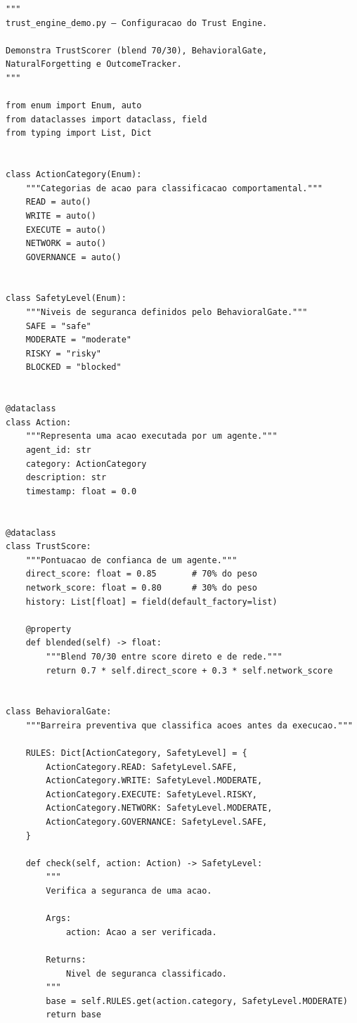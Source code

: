 \begin{lstlisting}[caption={Configuracao do Trust Engine},
                   label={cod:trust}, style=pythonstyle]
"""
trust_engine_demo.py — Configuracao do Trust Engine.

Demonstra TrustScorer (blend 70/30), BehavioralGate,
NaturalForgetting e OutcomeTracker.
"""

from enum import Enum, auto
from dataclasses import dataclass, field
from typing import List, Dict


class ActionCategory(Enum):
    """Categorias de acao para classificacao comportamental."""
    READ = auto()
    WRITE = auto()
    EXECUTE = auto()
    NETWORK = auto()
    GOVERNANCE = auto()


class SafetyLevel(Enum):
    """Niveis de seguranca definidos pelo BehavioralGate."""
    SAFE = "safe"
    MODERATE = "moderate"
    RISKY = "risky"
    BLOCKED = "blocked"


@dataclass
class Action:
    """Representa uma acao executada por um agente."""
    agent_id: str
    category: ActionCategory
    description: str
    timestamp: float = 0.0


@dataclass
class TrustScore:
    """Pontuacao de confianca de um agente."""
    direct_score: float = 0.85       # 70% do peso
    network_score: float = 0.80      # 30% do peso
    history: List[float] = field(default_factory=list)

    @property
    def blended(self) -> float:
        """Blend 70/30 entre score direto e de rede."""
        return 0.7 * self.direct_score + 0.3 * self.network_score


class BehavioralGate:
    """Barreira preventiva que classifica acoes antes da execucao."""

    RULES: Dict[ActionCategory, SafetyLevel] = {
        ActionCategory.READ: SafetyLevel.SAFE,
        ActionCategory.WRITE: SafetyLevel.MODERATE,
        ActionCategory.EXECUTE: SafetyLevel.RISKY,
        ActionCategory.NETWORK: SafetyLevel.MODERATE,
        ActionCategory.GOVERNANCE: SafetyLevel.SAFE,
    }

    def check(self, action: Action) -> SafetyLevel:
        """
        Verifica a seguranca de uma acao.

        Args:
            action: Acao a ser verificada.

        Returns:
            Nivel de seguranca classificado.
        """
        base = self.RULES.get(action.category, SafetyLevel.MODERATE)
        return base



\end{lstlisting}
